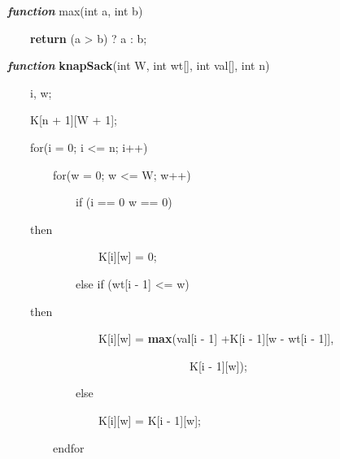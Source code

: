 \documentclass[letterpaper]{article}
\begin{document}
\begin{multicols}{2}
\textbf{\textit{\textcolor[rgb]{0.2509804,0.25882354,0.30588236}{function}}}\textcolor[rgb]{0.2509804,0.25882354,0.30588236}{
max(int a, int b)}

\textcolor[rgb]{0.2509804,0.25882354,0.30588236}{\ \ \ \ }\textbf{\textcolor[rgb]{0.2509804,0.25882354,0.30588236}{return}}\textcolor[rgb]{0.2509804,0.25882354,0.30588236}{
(a {\textgreater} b) ? a : b;}

\textbf{\textit{\textcolor[rgb]{0.2509804,0.25882354,0.30588236}{function}}}\textcolor[rgb]{0.2509804,0.25882354,0.30588236}{
}\textbf{\textcolor[rgb]{0.2509804,0.25882354,0.30588236}{knapSack}}\textcolor[rgb]{0.2509804,0.25882354,0.30588236}{(int
W, int wt[], int val[], int n)}

{\color[rgb]{0.2509804,0.25882354,0.30588236}
\ \ \ \ i, w;}

{\color[rgb]{0.2509804,0.25882354,0.30588236}
\ \ \ \ K[n + 1][W + 1];}

{\color[rgb]{0.2509804,0.25882354,0.30588236}
\ \ \ \ for(i = 0; i {\textless}= n; i++)}

{\color[rgb]{0.2509804,0.25882354,0.30588236}
\ \ \ \ \ \ \ \ for(w = 0; w {\textless}= W; w++)}

{\color[rgb]{0.2509804,0.25882354,0.30588236}
\ \ \ \ \ \ \ \ \ \ \ \ if (i == 0 {\textbar}{\textbar} w == 0)}

{\color[rgb]{0.2509804,0.25882354,0.30588236}
\ \ \ \  then}

{\color[rgb]{0.2509804,0.25882354,0.30588236}
\ \ \ \ \ \ \ \ \ \ \ \ \ \ \ \ K[i][w] = 0;}

{\color[rgb]{0.2509804,0.25882354,0.30588236}
\ \ \ \ \ \ \ \ \ \ \ \ else if (wt[i - 1] {\textless}= w)}

{\color[rgb]{0.2509804,0.25882354,0.30588236}
\ \ \ \  then}

\textcolor[rgb]{0.2509804,0.25882354,0.30588236}{\ \ \ \ \ \ \ \ \ \ \ \ \ \ \ \ K[i][w] =
}\textbf{\textcolor[rgb]{0.2509804,0.25882354,0.30588236}{max}}\textcolor[rgb]{0.2509804,0.25882354,0.30588236}{(val[i
- 1] +K[i - 1][w - wt[i - 1]],}

{\color[rgb]{0.2509804,0.25882354,0.30588236}
\ \ \ \ \ \ \ \ \ \ \ \ \ \ \ \ \ \ \ \ \ \ \ \ \ \ \ \ \ \ \ \ K[i - 1][w]);}

{\color[rgb]{0.2509804,0.25882354,0.30588236}
\ \ \ \ \ \ \ \ \ \ \ \ else}

{\color[rgb]{0.2509804,0.25882354,0.30588236}
\ \ \ \ \ \ \ \ \ \ \ \ \ \ \ \ K[i][w] = K[i - 1][w];}

{\color[rgb]{0.2509804,0.25882354,0.30588236}
\ \ \ \ \ \ \ \ endfor}


\end{multicols}
\end{document}
